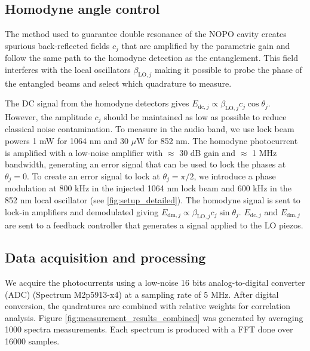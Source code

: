 \documentclass[final,twocolumn,english,prl,notitlepage,nofootinbib,floatfix,longbibliography,superscriptaddress
]{revtex4-2}
\begin{document}
\subsection*{Homodyne angle control}
The method used to guarantee double resonance of the NOPO cavity creates spurious back-reflected fields $c_j$ that are amplified by the parametric gain and follow the same path to the homodyne detection as the entanglement. This field interferes with the local oscillators $\beta_{\text{LO},j}$ making it possible to probe the phase of the entangled beams and select which quadrature to measure.\par
The DC signal from the homodyne detectors gives $E_{\text{dc},j} \propto \beta_{\text{LO},j}c_{j}\cos{\theta_j}$.  However, the amplitude $c_{j}$ should be maintained as low as possible to reduce classical noise contamination. To measure in the audio band, we use lock beam powers  1 mW for 1064 nm and 30 $\mu$W for 852 nm. The homodyne photocurrent is amplified with a low-noise amplifier with $\approx$ 30 dB gain and $\approx$ 1 MHz bandwidth, generating an error signal that can be used to lock the phases at $\theta_j = 0$. To create an error signal to lock at $\theta_j = \pi/2$, we introduce a phase modulation at 800 kHz in the injected 1064 nm lock beam and 600 kHz in the 852 nm local oscillator (see \ref{fig:setup_detailed}). The homodyne signal is sent to lock-in amplifiers and demodulated giving $E_{\text{dm},j} \propto \beta_{\text{LO},j}c_{j}\sin{\theta_j}$. $E_{\text{dc},j}$ and $E_{\text{dm},j}$ are sent to a feedback controller that generates a signal applied to the LO piezos.\par
\subsection*{Data acquisition and processing}
We acquire the photocurrents using a low-noise 16 bits analog-to-digital converter (ADC) (Spectrum M2p5913-x4) at a sampling rate of 5 MHz. After digital conversion, the quadratures are combined with relative weights for correlation analysis. Figure \ref{fig:measurement_results_combined} was generated by averaging 1000 spectra measurements. Each spectrum is produced with a FFT done over 16000 samples.\par
\end{document}
